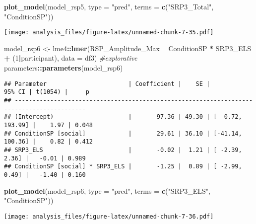 \documentclass[
]{article}
\newenvironment{Shaded}{\begin{snugshade}}{\end{snugshade}}
\newcommand{\CommentTok}[1]{\textcolor[rgb]{0.56,0.35,0.01}{\textit{#1}}}
\newcommand{\DataTypeTok}[1]{\textcolor[rgb]{0.13,0.29,0.53}{#1}}
\newcommand{\DecValTok}[1]{\textcolor[rgb]{0.00,0.00,0.81}{#1}}
\newcommand{\KeywordTok}[1]{\textcolor[rgb]{0.13,0.29,0.53}{\textbf{#1}}}
\newcommand{\NormalTok}[1]{#1}
\newcommand{\OperatorTok}[1]{\textcolor[rgb]{0.81,0.36,0.00}{\textbf{#1}}}
\newcommand{\StringTok}[1]{\textcolor[rgb]{0.31,0.60,0.02}{#1}}
\begin{document}
\begin{Shaded}
\begin{Highlighting}[]
\KeywordTok{plot_model}\NormalTok{(model_rsp5, }\DataTypeTok{type =} \StringTok{"pred"}\NormalTok{, }\DataTypeTok{terms =} \KeywordTok{c}\NormalTok{(}\StringTok{"SRP3_Total"}\NormalTok{, }\StringTok{"ConditionSP"}\NormalTok{))}
\end{Highlighting}
\end{Shaded}

\texttt{[image: analysis\_files/figure-latex/unnamed-chunk-7-35.pdf]}

\begin{Shaded}
\begin{Highlighting}[]
\NormalTok{model_rsp6 <-}\StringTok{ }\NormalTok{lme4}\OperatorTok{::}\KeywordTok{lmer}\NormalTok{(RSP_Amplitude_Max }\OperatorTok{~}\StringTok{ }\NormalTok{ConditionSP }\OperatorTok{*}\StringTok{ }\NormalTok{SRP3_ELS }\OperatorTok{+}\StringTok{ }\NormalTok{(}\DecValTok{1}\OperatorTok{|}\NormalTok{participant), }\DataTypeTok{data =}\NormalTok{ df3)  }\CommentTok{#explorative}
\NormalTok{parameters}\OperatorTok{::}\KeywordTok{parameters}\NormalTok{(model_rsp6)}
\end{Highlighting}
\end{Shaded}

\begin{verbatim}
## Parameter                       | Coefficient |    SE |           95% CI | t(1054) |     p
## ------------------------------------------------------------------------------------------
## (Intercept)                     |       97.36 | 49.30 | [  0.72, 193.99] |    1.97 | 0.048
## ConditionSP [social]            |       29.61 | 36.10 | [-41.14, 100.36] |    0.82 | 0.412
## SRP3_ELS                        |       -0.02 |  1.21 | [ -2.39,   2.36] |   -0.01 | 0.989
## ConditionSP [social] * SRP3_ELS |       -1.25 |  0.89 | [ -2.99,   0.49] |   -1.40 | 0.160
\end{verbatim}

\begin{Shaded}
\begin{Highlighting}[]
\KeywordTok{plot_model}\NormalTok{(model_rsp6, }\DataTypeTok{type =} \StringTok{"pred"}\NormalTok{, }\DataTypeTok{terms =} \KeywordTok{c}\NormalTok{(}\StringTok{"SRP3_ELS"}\NormalTok{, }\StringTok{"ConditionSP"}\NormalTok{))}
\end{Highlighting}
\end{Shaded}

\texttt{[image: analysis\_files/figure-latex/unnamed-chunk-7-36.pdf]}
\end{document}
